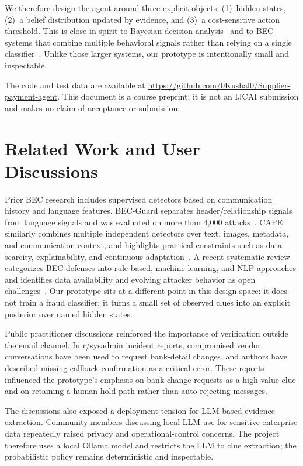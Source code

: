 \documentclass{article}
\begin{document}
We therefore design the agent around three explicit objects: (1)~hidden states, (2)~a belief distribution updated by evidence, and (3)~a cost-sensitive action threshold. This is close in spirit to Bayesian decision analysis~\cite{berger1985} and to BEC systems that combine multiple behavioral signals rather than relying on a single classifier~\cite{cidon2019,brabec2023}. Unlike those larger systems, our prototype is intentionally small and inspectable.

The code and test data are available at \url{https://github.com/0Kushal0/Supplier-payment-agent}. This document is a course preprint; it is not an IJCAI submission and makes no claim of acceptance or submission.

\section{Related Work and User Discussions}

Prior BEC research includes supervised detectors based on communication history and language features. BEC-Guard separates header/relationship signals from language signals and was evaluated on more than 4{,}000 attacks~\cite{cidon2019}. CAPE similarly combines multiple independent detectors over text, images, metadata, and communication context, and highlights practical constraints such as data scarcity, explainability, and continuous adaptation~\cite{brabec2023}. A recent systematic review categorizes BEC defenses into rule-based, machine-learning, and NLP approaches and identifies data availability and evolving attacker behavior as open challenges~\cite{almutairi2025}. Our prototype sits at a different point in this design space: it does not train a fraud classifier; it turns a small set of observed clues into an explicit posterior over named hidden states.

Public practitioner discussions reinforced the importance of verification outside the email channel. In r/sysadmin incident reports, compromised vendor conversations have been used to request bank-detail changes, and authors have described missing callback confirmation as a critical error. These reports influenced the prototype's emphasis on bank-change requests as a high-value clue and on retaining a human hold path rather than auto-rejecting messages.

The discussions also exposed a deployment tension for LLM-based evidence extraction. Community members discussing local LLM use for sensitive enterprise data repeatedly raised privacy and operational-control concerns. The project therefore uses a local Ollama model and restricts the LLM to clue extraction; the probabilistic policy remains deterministic and inspectable.
\end{document}
